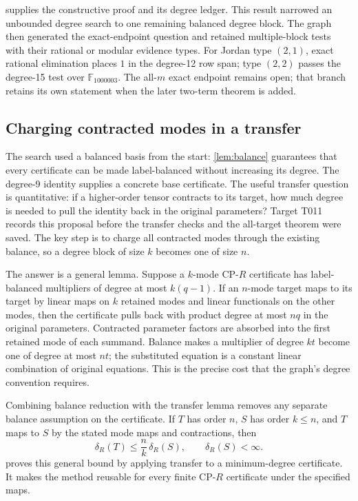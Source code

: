  supplies the constructive proof and its degree ledger. This result narrowed an unbounded degree search to one remaining balanced degree block. The graph then generated the exact-endpoint question and retained multiple-block tests with their rational or modular evidence types. For Jordan type $(2,1)$, exact rational elimination places $1$ in the degree-12 row span; type $(2,2)$ passes the degree-15 test over $\mathbb F_{1000003}$. The all-$m$ exact endpoint remains open; that branch retains its own statement when the later two-term theorem is added.

\subsection{Charging contracted modes in a transfer}

The search used a balanced basis from the start: \cref{lem:balance} guarantees that every certificate can be made label-balanced without increasing its degree. The degree-9 identity supplies a concrete base certificate. The useful transfer question is quantitative: if a higher-order tensor contracts to its target, how much degree is needed to pull the identity back in the original parameters? Target T011 records this proposal before the transfer checks and the all-target theorem were saved. The key step is to charge all contracted modes through the existing balance, so a degree block of size $k$ becomes one of size $n$.

The answer is a general lemma. Suppose a $k$-mode CP-$R$ certificate has label-balanced multipliers of degree at most $k(q-1)$. If an $n$-mode target maps to its target by linear maps on $k$ retained modes and linear functionals on the other modes, then the certificate pulls back with product degree at most $nq$ in the original parameters. Contracted parameter factors are absorbed into the first retained mode of each summand. Balance makes a multiplier of degree $kt$ become one of degree at most $nt$; the substituted equation is a constant linear combination of original equations. This is the precise cost that the graph's degree convention requires.

Combining balance reduction with the transfer lemma removes any separate balance assumption on the certificate. If $T$ has order $n$, $S$ has order $k\le n$, and $T$ maps to $S$ by the stated mode maps and contractions, then
\[
 \delta_R(T)\le\frac{n}{k}\,\delta_R(S),\qquad \delta_R(S)<\infty.
\]
 proves this general bound by applying transfer to a minimum-degree certificate. It makes the method reusable for every finite CP-$R$ certificate under the specified maps.

